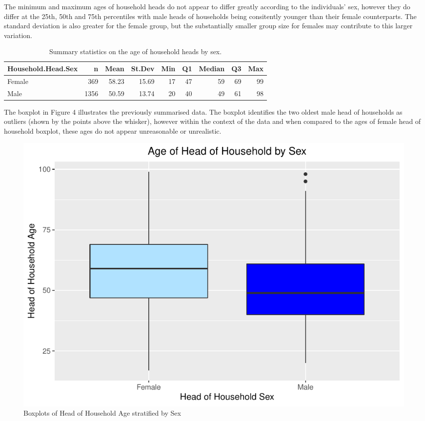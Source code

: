 \documentclass[
]{article}
\begin{document}
The minimum and maximum ages of household heads do not appear to differ
greatly according to the individuals' sex, however they do differ at the
25th, 50th and 75th percentiles with male heads of households being
consitently younger than their female counterparts. The standard
deviation is also greater for the female group, but the substantially
smaller group size for females may contribute to this larger variation.

\begin{table}[!h]

\caption{\label{tab:summaries of age by sex}Summary statistics on the age of household heads by sex.}
\centering
\begin{tabular}[t]{l|r|r|r|r|r|r|r|r}
\hline
Household.Head.Sex & n & Mean & St.Dev & Min & Q1 & Median & Q3 & Max\\
\hline
Female & 369 & 58.23 & 15.69 & 17 & 47 & 59 & 69 & 99\\
\hline
Male & 1356 & 50.59 & 13.74 & 20 & 40 & 49 & 61 & 98\\
\hline
\end{tabular}
\end{table}

The boxplot in Figure 4 illustrates the previously summarised data. The
boxplot identifies the two oldest male head of households as outliers
(shown by the points above the whisker), however within the context of
the data and when compared to the ages of female head of household
boxplot, these ages do not appear unreasonable or unrealistic.

\begin{figure}

{\centering \includegraphics[width=0.8\linewidth]{Group_01_Project2_demo_files/figure-latex/boxplot of age by gender-1} 

}

\caption{Boxplots of Head of Household Age stratified by Sex}\label{fig:boxplot of age by gender}
\end{figure}
\end{document}
